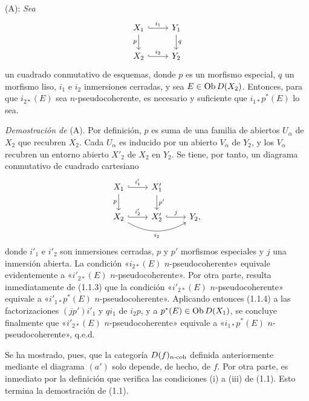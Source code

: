(A): \emph{Sea}
\[
\begin{tikzcd}
X_1 \arrow[r,hook,"i_1"] \arrow[d,"p"'] & Y_1 \arrow[d,"q"]\\
X_2 \arrow[r,hook,"i_2"] & Y_2
\end{tikzcd}
\]
un cuadrado conmutativo de esquemas, donde \(p\) es un morfismo especial, \(q\) un morfismo liso, \(i_1\) e \(i_2\) inmersiones cerradas, y sea \(E\in\operatorname{Ob} D(X_2)\). Entonces, para que \(i_{2*}(E)\) sea \(n\)-pseudocoherente, es necesario y suficiente que \(i_{1*}p^*(E)\) lo sea.

\emph{Demostración de} (A). Por definición, \(p\) es suma de una familia de abiertos \(U_\alpha\) de \(X_2\) que recubren \(X_2\). Cada \(U_\alpha\) es inducido por un abierto \(V_\alpha\) de \(Y_2\), y los \(V_\alpha\) recubren un entorno abierto \(X'_2\) de \(X_2\) en \(Y_2\). Se tiene, por tanto, un diagrama conmutativo de cuadrado cartesiano
\[
\begin{tikzcd}
X_1 \arrow[r,hook,"i'_1"] \arrow[d,"p"'] & X'_1 \arrow[d,"p'"]\\
X_2 \arrow[r,hook,"i'_2"] \arrow[rr,bend right,"i_2"'] & X'_2 \arrow[r,hook,"j"] & Y_2,
\end{tikzcd}
\]
donde \(i'_1\) e \(i'_2\) son inmersiones cerradas, \(p\) y \(p'\) morfismos especiales y \(j\) una inmersión abierta. La condición «\(i_{2*}(E)\) \(n\)-pseudocoherente» equivale evidentemente a «\(i'_{2*}(E)\) \(n\)-pseudocoherente». Por otra parte, resulta inmediatamente de (1.1.3) que la condición «\(i'_{2*}(E)\) \(n\)-pseudocoherente» equivale a «\(i'_{1*}p^*(E)\) \(n\)-pseudocoherente». Aplicando entonces (1.1.4) a las factorizaciones \((jp')i'_1\) y \(qi_1\) de \(i_2p\), y a \(p^*(E)\in\operatorname{Ob} D(X_1)\), se concluye finalmente que «\(i'_{2*}(E)\) \(n\)-pseudocoherente» equivale a «\(i_{1*}p^*(E)\) \(n\)-pseudocoherente», q.e.d.

Se ha mostrado, pues, que la categoría \(D(f)_{n\text{-}\mathrm{coh}}\) definida anteriormente mediante el diagrama \((a')\) solo depende, de hecho, de \(f\). Por otra parte, es inmediato por la definición que verifica las condiciones (i) a (iii) de (1.1). Esto termina la demostración de (1.1).
